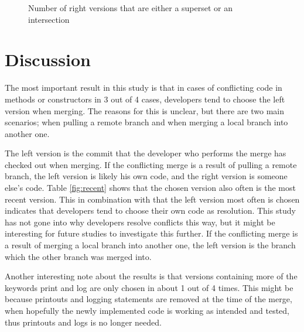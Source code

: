 

\begin{figure}
\caption{Number of right versions that are either a superset or an intersection}\label{fig:setright}
\end{figure}

\section{Discussion}
The most important result in this study is that in cases of conflicting code in methods or constructors in 3 out of 4 cases, developers tend to choose the left version when merging. The reasons for this is unclear, but there are two main scenarios; when pulling a remote branch and when merging a local branch into another one.

The left version is the commit that the developer who performs the merge has checked out when merging. If the conflicting merge is a result of pulling a remote branch, the left version is likely his own code, and the right version is someone else’s code. Table \ref{fig:recent} shows that the chosen version also often is the most recent version. This in combination with that the left version most often is chosen indicates that developers tend to choose their own code as resolution. This study has not gone into why developers resolve conflicts this way, but it might be interesting for future studies to investigate this further. If the conflicting merge is a result of merging a local branch into another one, the left version is the branch which the other branch was merged into.

Another interesting note about the results is that versions containing more of the keywords print and log are only chosen in about 1 out of 4 times. This might be because printouts and logging statements are removed at the time of the merge, when hopefully the newly implemented code is working as intended and tested, thus printouts and logs is no longer needed.

